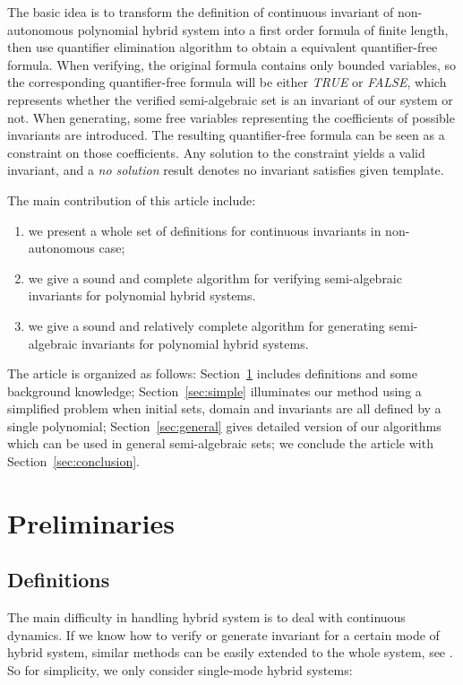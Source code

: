 \documentclass{jssc}
\begin{document}
The basic idea is to transform the definition of continuous invariant of non-autonomous polynomial hybrid system into a first order formula of finite length, then use quantifier elimination algorithm to obtain a equivalent quantifier-free formula. When verifying, the original formula contains only bounded variables, so the corresponding quantifier-free  formula will be either \emph{TRUE} or \emph{FALSE}, which represents whether the verified semi-algebraic set is an invariant of our system or not. When generating, some free variables representing the coefficients of possible invariants are introduced. The resulting quantifier-free formula can be seen as a constraint on those coefficients. Any solution to the constraint yields a valid invariant, and a \emph{no solution} result denotes no invariant satisfies given template.

The main contribution of this article include:
\begin{enumerate}
	\item we present a whole set of definitions for continuous invariants in non-autonomous case;
	\item we give a sound and complete algorithm for verifying semi-algebraic invariants for polynomial hybrid systems.
	\item we give a sound and relatively complete algorithm for generating semi-algebraic invariants for polynomial hybrid systems.
\end{enumerate}

The article is organized as follows: Section~\ref{sec:preliminaries} includes definitions and some background knowledge; Section~\ref{sec:simple} illuminates our method using a simplified problem when initial sets, domain and invariants are all defined by a single polynomial; Section~\ref{sec:general} gives detailed version of our algorithms which can be used in general semi-algebraic sets; we conclude the article with Section~\ref{sec:conclusion}.

\section{Preliminaries}
\label{sec:preliminaries}
\subsection{Definitions}
The main difficulty in handling hybrid system is to deal with continuous dynamics. If we know how to verify or generate invariant for a certain mode of hybrid system, similar methods can be easily extended to the whole system, see \cite{prajna2004safety, kong2016invariant}. So for simplicity, we only consider single-mode hybrid systems:
\end{document}
